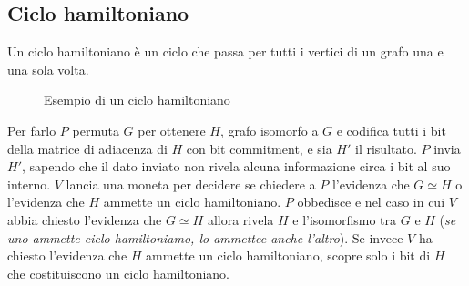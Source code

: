 \subsection{Ciclo hamiltoniano}
\begin{tcolorbox}
    Un ciclo hamiltoniano è un ciclo che passa per tutti i vertici di un grafo una e una sola volta.
\end{tcolorbox}
\begin{figure}[H]
    \centering
    \caption{Esempio di un ciclo hamiltoniano}
\end{figure}
Per farlo $P$ permuta $G$ per ottenere $H$, grafo isomorfo a $G$ e codifica tutti i bit della matrice di adiacenza
di $H$ con bit commitment, e sia $H'$ il risultato. $P$ invia $H'$, sapendo che il dato inviato non rivela alcuna 
informazione circa i bit al suo interno. $V$ lancia una moneta per decidere se chiedere a $P$ l'evidenza 
che $G \simeq H$ o l'evidenza che $H$ ammette un ciclo hamiltoniano. 
$P$ obbedisce e nel caso in cui $V$ abbia chiesto l'evidenza che $G \simeq H$ allora rivela $H$ e l'isomorfismo
tra $G$ e $H$ (\textit{se uno ammette ciclo hamiltoniamo, lo ammettee anche l'altro}).
Se invece $V$ ha chiesto l'evidenza che $H$ ammette un ciclo hamiltoniano, scopre solo i bit di $H$ che 
costituiscono un ciclo hamiltoniano.

